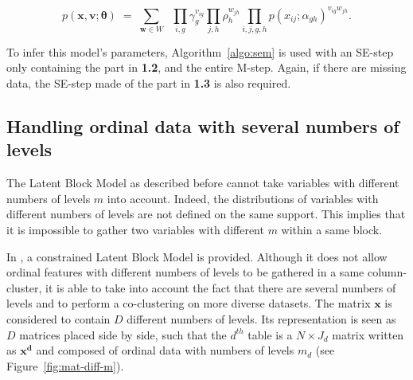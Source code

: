 \begin{equation}
\label{eq:classif2}
  p\left(\boldsymbol{x},\boldsymbol{v};\boldsymbol{\theta}\right) \;=\;
  \underset{\boldsymbol{w} \in W}{\sum} \;\;
    \underset{i,g}{\prod}\gamma_g^{v_{ig}}
    \underset{j,h}{\prod}\rho_h^{w_{jh}} 
    \underset{i,j,g,h}{\prod}p\left(x_{ij};\alpha_{gh}\right)^{v_{ig}w_{jh}}.
\end{equation}

\noindent To infer this model's parameters, Algorithm~\ref{algo:sem} is used with an SE-step only containing the part in {\bf 1.2}, and  the entire M-step. Again, if there are missing data, the SE-step made of the part in {\bf 1.3} is also required. 

\subsection{Handling ordinal data with several numbers of levels}
\label{sec:diff-m}
The Latent Block Model as described before cannot take variables with different numbers of levels $m$ into account. Indeed, the distributions of variables with different numbers of levels are not defined on the same support. This implies that it is impossible to gather two variables with different $m$ within a same block. 


\noindent In \citet{Selosse18}, a constrained Latent Block Model is provided. Although it does not allow ordinal features with different numbers of levels to be gathered in a same column-cluster, it is able to take into account the fact that there are several numbers of levels and to perform a co-clustering on more diverse datasets. The matrix $\boldsymbol{x}$ is considered to contain $D$ different numbers of levels. Its representation is seen as $D$ matrices placed side by side, such that the $d^{th}$ table is a $N\times J_d$ matrix written as $\boldsymbol{x^d}$ and composed of ordinal data with numbers of levels $m_d$ (see Figure~\ref{fig:mat-diff-m}).

